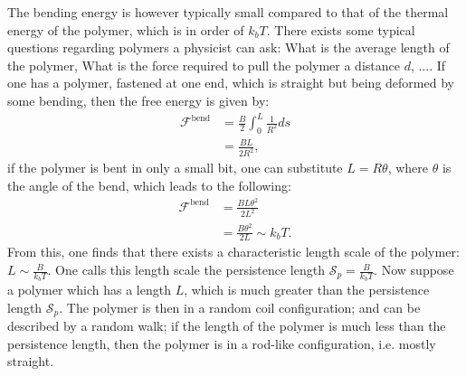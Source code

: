 \documentclass[a4paper]{article}
\newcommand{\f}{\mathcal{F}}
\begin{document}
\vspace*{0.5cm}\noindent
The bending energy is however typically small compared to that of the thermal energy of the polymer, which is in order of $k_bT$.
There exists some typical questions regarding polymers a physicist can ask: What is the average length of the polymer, What is the force required to pull the polymer a distance $d$, ....
If one has a polymer, fastened at one end, which is straight but being deformed by some bending, then the free energy is given by:
\begin{align*}
    \f^{\text{bend}} &= \frac{B}{2}\int_0^L \frac{1}{R^2} ds\\
    &=\frac{BL}{2R^2},
\end{align*}if the polymer is bent in only a small bit, one can substitute $L = R\theta$, where $\theta$ is the angle of the bend, which leads to the following:
\begin{align*}
    \f^{\text{bend}} &=\frac{BL\theta^2}{2L^2}\\
    &= \frac{B\theta^2}{2L}\sim k_bT.
\end{align*}From this, one finds that there exists a characteristic length scale of the polymer: $L\sim \frac{B}{k_bT}$. One calls this length scale the persistence length $\mathcal{S}_p = \frac{B}{k_bT}$.
Now suppose a polymer which has a length $L$, which is much greater than the persistence length $\mathcal{S}_p$. The polymer is then in a random coil configuration; and can be described by a random walk; if the length of the polymer is much less than the persistence length, then the polymer is in a rod-like configuration, i.e. mostly straight.
\end{document}
